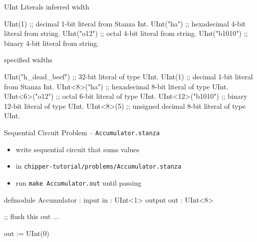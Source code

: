 \documentclass[xcolor=pdflatex,dvipsnames,table]{beamer}
\begin{document}
\begin{frame}[fragile]{UInt Literals}
inferred width
\begin{stanza}
UInt(1)       ;; decimal 1-bit literal from Stanza Int. 
UInt("ha")    ;; hexadecimal 4-bit literal from string.
UInt("o12")   ;; octal 4-bit literal from string. 
UInt("b1010") ;; binary 4-bit literal from string.
\end{stanza}
specified widths
\begin{stanza}
UInt("h_dead_beef") ;; 32-bit literal of type UInt.
UInt(1)             ;; decimal 1-bit literal from Stanza Int.
UInt<8>("ha")       ;; hexadecimal 8-bit literal of type UInt.
UInt<6>("o12")      ;; octal 6-bit literal of type UInt.
UInt<12>("b1010")   ;; binary 12-bit literal of type UInt.
UInt<8>(5)          ;; unsigned decimal 8-bit literal of type UInt.
\end{stanza}
\end{frame}


\begin{frame}[fragile]{Sequential Circuit Problem -- \tt Accumulator.stanza}
\begin{itemize}
\item write sequential circuit that sums  values
\item in {\tt chipper-tutorial/problems/Accumulator.stanza}
\item run {\tt make Accumulator.out} until passing
\end{itemize}
\begin{stanza}
defmodule Accumulator :
  input in : UInt<1>
  output out : UInt<8>

  ;; flush this out ...

  out := UInt(0)
\end{stanza}
\end{frame}
\end{document}
